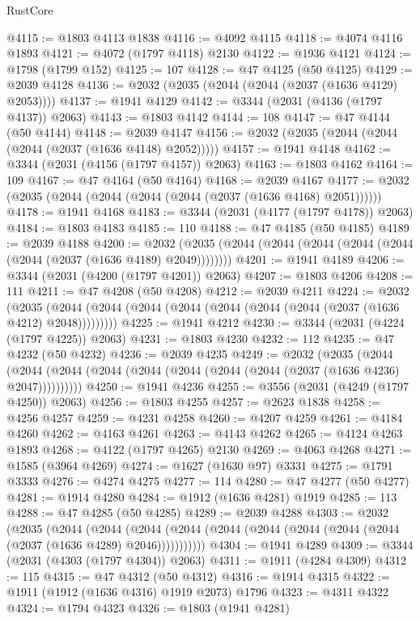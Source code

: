 \begin{lexlean}{RustCore}
\begin{coremodule}
@4115 := @1803 @4113 @1838
@4116 := @4092 @4115
@4118 := @4074 @4116 @1893
@4121 := @4072 (@1797 @4118) @2130
@4122 := @1936 @4121
@4124 := @1798 (@1799 @152)
@4125 := 107
@4128 := @47 @4125 (@50 @4125)
@4129 := @2039 @4128
@4136 := @2032 (@2035 (@2044 (@2044 (@2037 (@1636 @4129) @2053))))
@4137 := @1941 @4129
@4142 := @3344 (@2031 (@4136 (@1797 @4137)) @2063)
@4143 := @1803 @4142
@4144 := 108
@4147 := @47 @4144 (@50 @4144)
@4148 := @2039 @4147
@4156 := @2032 (@2035 (@2044 (@2044 (@2044 (@2037 (@1636 @4148) @2052)))))
@4157 := @1941 @4148
@4162 := @3344 (@2031 (@4156 (@1797 @4157)) @2063)
@4163 := @1803 @4162
@4164 := 109
@4167 := @47 @4164 (@50 @4164)
@4168 := @2039 @4167
@4177 := @2032 (@2035 (@2044 (@2044 (@2044 (@2044 (@2037 (@1636 @4168) @2051))))))
@4178 := @1941 @4168
@4183 := @3344 (@2031 (@4177 (@1797 @4178)) @2063)
@4184 := @1803 @4183
@4185 := 110
@4188 := @47 @4185 (@50 @4185)
@4189 := @2039 @4188
@4200 := @2032 (@2035 (@2044 (@2044 (@2044 (@2044 (@2044 (@2044 (@2037 (@1636 @4189) @2049))))))))
@4201 := @1941 @4189
@4206 := @3344 (@2031 (@4200 (@1797 @4201)) @2063)
@4207 := @1803 @4206
@4208 := 111
@4211 := @47 @4208 (@50 @4208)
@4212 := @2039 @4211
@4224 := @2032
    (@2035 (@2044 (@2044 (@2044 (@2044 (@2044 (@2044 (@2044 (@2037 (@1636 @4212) @2048)))))))))
@4225 := @1941 @4212
@4230 := @3344 (@2031 (@4224 (@1797 @4225)) @2063)
@4231 := @1803 @4230
@4232 := 112
@4235 := @47 @4232 (@50 @4232)
@4236 := @2039 @4235
@4249 := @2032
    (@2035
      (@2044 (@2044 (@2044 (@2044 (@2044 (@2044 (@2044 (@2044 (@2037 (@1636 @4236) @2047))))))))))
@4250 := @1941 @4236
@4255 := @3556 (@2031 (@4249 (@1797 @4250)) @2063)
@4256 := @1803 @4255
@4257 := @2623 @1838
@4258 := @4256 @4257
@4259 := @4231 @4258
@4260 := @4207 @4259
@4261 := @4184 @4260
@4262 := @4163 @4261
@4263 := @4143 @4262
@4265 := @4124 @4263 @1893
@4268 := @4122 (@1797 @4265) @2130
@4269 := @4063 @4268
@4271 := @1585 (@3964 @4269)
@4274 := @1627 (@1630 @97) @3331
@4275 := @1791 @3333
@4276 := @4274 @4275
@4277 := 114
@4280 := @47 @4277 (@50 @4277)
@4281 := @1914 @4280
@4284 := @1912 (@1636 @4281) @1919
@4285 := 113
@4288 := @47 @4285 (@50 @4285)
@4289 := @2039 @4288
@4303 := @2032
    (@2035
      (@2044
        (@2044
          (@2044 (@2044 (@2044 (@2044 (@2044 (@2044 (@2044 (@2037 (@1636 @4289) @2046)))))))))))
@4304 := @1941 @4289
@4309 := @3344 (@2031 (@4303 (@1797 @4304)) @2063)
@4311 := @1911 (@4284 @4309)
@4312 := 115
@4315 := @47 @4312 (@50 @4312)
@4316 := @1914 @4315
@4322 := @1911 (@1912 (@1636 @4316) @1919 @2073) @1796
@4323 := @4311 @4322
@4324 := @1794 @4323
@4326 := @1803 (@1941 @4281)

\end{coremodule}
\end{lexlean}
